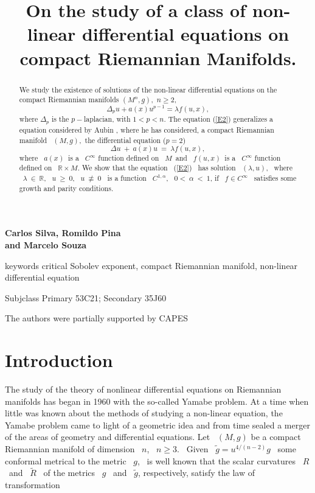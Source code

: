 \documentclass[12pt]{article}
\begin{document}
\title{\centering  On the study of a class of non-linear differential equations on compact Riemannian Manifolds.}

\maketitle

\begin{center}{\bf Carlos Silva, Romildo Pina \\ \bf and  Marcelo Souza }
 
\end{center}

\begin{abstract} 
{ We study the existence of solutions of the non-linear differential equations on the compact Riemannian manifolds $(M^n,g),\,\,
 n\geq 2$, 
 \begin{equation}
\label{E2}
\Delta_p u + a(x)u^{p-1} = \lambda f(u,x),
\end{equation} 
where $\Delta_p$ is the $p-$laplacian, with $1<p<n$.
 The equation (\ref{E2}) generalizes a equation considered by Aubin \cite{aubin3}, where he has considered,
  a compact Riemannian manifold  \ $(M,g)$,\  the  differential equation   ($p=2$) 
\begin{equation}
\label{E1}
\Delta u \ +\  a(x)u \ = \ \lambda f(u,x),
\end{equation}
where \ $a(x)$\  is a \ $C^{\infty}$ function  defined on \ $M$\  and \ $f(u,x)$\  is a \ $C^{\infty}$ function  defined on 
\ $\mathbb{R}\times M$.                          
We show that the equation \ (\ref{E2}) \ has solution \ $(\lambda,u)$, 
\ where \ $\lambda \ \in 
\ \mathbb{R}$, \ $u \ \geq \ 0$, \ $u \ \not\equiv \ 0$ \ is a function \ $C^{1,\alpha}$, \ $0 < \ \alpha \ < \  1$,
if \ $f \in C^{\infty}$ \ satisfies some
growth and parity conditions.}
\end{abstract}

keywords {critical Sobolev exponent, compact Riemannian manifold, non-linear differential equation}

Subjclass {Primary 53C21; Secondary 35J60}

{The authors were partially supported by CAPES}

\section{Introduction}

The study of the theory of nonlinear differential equations on 
Riemannian manifolds has began in 1960 with the so-called Yamabe problem. At a time when little was known 
about the methods of studying a non-linear equation, the Yamabe problem came to light of a geometric idea and from time sealed a 
merger of the areas of geometry and differential equations.
Let \ $(M,g)$ be a compact Riemannian manifold of dimension \ $n$, \ $n \geq 3$. \ Given \ $\widetilde{g} = u^{4/(n - 2)}g$
 \  some conformal metrical to the metric \ $g$, \ is well known that the scalar curvatures
  \ $R$ \ and \ $\widetilde{R}$ \ of the metrics \ $g$ \ and \ $\widetilde{g}$, 
respectively, satisfy the law of transformation
\end{document}
